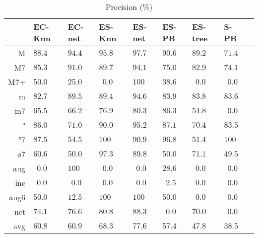 \begin{table}
  \centering
\begin{tabular}{r|p{0.5cm}p{0.5cm}p{0.5cm}p{0.5cm}p{0.5cm}p{0.5cm}p{0.5cm}p{0.5cm}}
     &   EC-Knn &   EC-net &   ES-Knn &   ES-net &    ES-PB &  ES-tree &   S-PB \\ \hline
   M & $  88.4$ & $  94.4$ & $  95.8$ & $  97.7$ & $  90.6$ & $  89.2$ & $  71.4$ \\
  M7 & $  85.3$ & $  91.0$ & $  89.7$ & $  94.1$ & $  75.0$ & $  82.9$ & $  74.1$ \\
 M7+ & $  50.0$ & $  25.0$ & $ ~~0.0$ & $ 100  $ & $  38.6$ & $ ~~0.0$ & $ ~~0.0$ \\
   m & $  82.7$ & $  89.5$ & $  89.4$ & $  94.6$ & $  83.9$ & $  83.8$ & $  83.6$ \\
  m7 & $  65.5$ & $  66.2$ & $  76.9$ & $  80.3$ & $  86.3$ & $  54.8$ & $ ~~0.0$ \\
  °  & $  86.0$ & $  71.0$ & $  90.0$ & $  95.2$ & $  87.1$ & $  70.4$ & $  83.5$ \\
 °7  & $  87.5$ & $  54.5$ & $ 100$   & $  90.9$ & $  96.8$ & $  51.4$ & $ 100$ \\
 ø7  & $  60.6$ & $  50.0$ & $  97.3$ & $  89.8$ & $  50.0$ & $  71.1$ & $  49.5$ \\
 aug & $ ~~0.0$ & $ 100  $ & $ ~~0.0$ & $ ~~0.0$ & $  28.6$ & $ ~~0.0$ & $ ~~0.0$ \\
 inc & $ ~~0.0$ & $ ~~0.0$ & $ ~~0.0$ & $ ~~0.0$ & $ ~~2.5$ & $ ~~0.0$ & $ ~~0.0$ \\
aug6 & $  50.0$ & $  12.5$ & $ 100  $ & $ 100  $ & $  50.0$ & $ ~~0.0$ & $ ~~0.0$ \\
 nct & $  74.1$ & $  76.6$ & $  80.8$ & $  88.3$ & $ ~~0.0$ & $  70.0$ & $ ~~0.0$ \\
\hline                                                       
avg & $   60.8$ & $  60.9$ & $  68.3$ & $  77.6$ & $  57.4$ & $  47.8$ & $  38.5$ \\
\end{tabular}


  \caption{Precision (\%)}
  \label{tab:precision}
\end{table}

